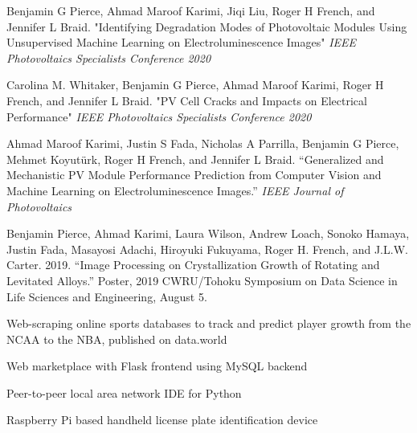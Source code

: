 \documentclass[10pt]{article}
\begin{document}
	{\begin{newitemize}
		\item{{ Benjamin G Pierce}, Ahmad Maroof Karimi, Jiqi Liu, Roger H French, and Jennifer L Braid. "Identifying Degradation Modes  of Photovoltaic Modules Using Unsupervised Machine Learning on Electroluminescence Images" \textit{IEEE Photovoltaics Specialists Conference 2020}}
		\item{Carolina M. Whitaker, { Benjamin G Pierce}, Ahmad Maroof Karimi, Roger H French, and Jennifer L Braid. "PV Cell Cracks and Impacts on Electrical Performance" \textit{IEEE Photovoltaics Specialists Conference 2020}}
		\item{Ahmad Maroof Karimi, Justin S Fada, Nicholas A Parrilla, { Benjamin G Pierce}, Mehmet Koyutürk, Roger H French, and Jennifer L Braid. “Generalized and Mechanistic PV Module Performance Prediction from Computer Vision and Machine Learning on Electroluminescence Images.” \textit{IEEE Journal of Photovoltaics} }
		\item{{ Benjamin Pierce}, Ahmad Karimi, Laura Wilson, Andrew Loach, Sonoko Hamaya, Justin Fada, Masayosi Adachi, Hiroyuki Fukuyama, Roger H. French, and J.L.W. Carter. 2019. “Image Processing on Crystallization Growth of Rotating and Levitated Alloys.” Poster, 2019 CWRU/Tohoku Symposium on Data Science in Life Sciences and Engineering, August 5.}
	\end{newitemize}}
	
	{\begin{newitemize}
		\item{Web-scraping online sports databases to track and predict player growth from the NCAA to the NBA, published on data.world}
		\item{Web marketplace with Flask frontend using MySQL backend}
		\item{Peer-to-peer local area network IDE for Python}
		\item{Raspberry Pi based handheld license plate identification device}
		  
	\end{newitemize}}
\end{document}
